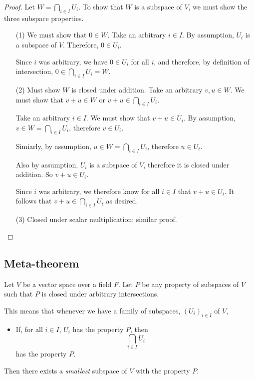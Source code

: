 \documentclass[11pt]{article}
\begin{document}
    \begin{proof}
        Let \(W = \bigcap_{i \in I} U_i\). To show that $W$ is a subspace of $V$, we must show the three subspace properties.
        \begin{enumerate}
            \item[(1)] We must show that \(0 \in W\). Take an arbitrary \(i \in I\). By assumption, \(U_i\) is a subspace of $V$. Therefore, \(0 \in U_i\).
            
            Since $i$ was arbitrary, we have \(0 \in U_i\) for all $i$, and therefore, by definition of intersection, \(0 \in \bigcap_{i \in I} U_i = W\).

            \item[(2)] Must show $W$ is closed under addition. Take an arbitrary \(v,u \in W\). We must show that \(v + u \in W\) or \(v + u \in \bigcap_{i \in I} U_i\).
            
            Take an arbitrary \(i \in I\). We must show that \(v + u \in U_i\). By assumption, \(v \in W = \bigcap_{i \in I} U_i\), therefore \(v \in U_i\).

            Simiarly, by assumption, \(u \in W = \bigcap_{i \in I} U_i\), therefore \(u \in U_i\).

            Also by assumption, \(U_i\) is a subspace of $V$, therefore it is closed under addition. So \(v + u \in U_i\).

            Since $i$ was arbitrary, we therefore know for all \(i \in I\) that \(v + u \in U_i\). It follows that \(v + u \in \bigcap_{i \in I} U_i\) as desired.

            \item[(3)] Closed under scalar multiplication: similar proof.
        \end{enumerate}
    \end{proof}

    \subsection{Meta-theorem}

    Let $V$ be a vector space over a field $F$. Let $P$ be any property of subspaces of $V$ such that $P$ is closed under arbitrary intersections.

    This means that whenever we have a family of subspaces, \((U_i)_{i \in I}\) of $V$,
    \begin{itemize}
        \item If, for all \(i \in I\), \(U_i\) has the property $P$, then \[\bigcap_{i \in I} U_i\] has the property $P$.
    \end{itemize}
    Then there exists a \emph{smallest} subspace of $V$ with the property $P$.
\end{document}
